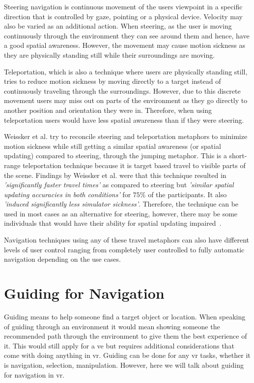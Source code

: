 Steering navigation is continuous movement of the users viewpoint in a specific direction that is controlled by gaze, pointing or a physical device. Velocity may also be varied as an additional action. When steering, as the user is moving continuously through the environment they can see around them and hence, have a good spatial awareness. However, the movement may cause motion sickness as they are physically standing still while their surroundings are moving.

Teleportation, which is also a technique where users are physically standing still, tries to reduce motion sickness by moving directly to a target instead of continuously traveling through the surroundings. However, due to this discrete movement users may miss out on parts of the environment as they go directly to another position and orientation they were in. Therefore, when using teleportation users would have less spatial awareness than if they were steering.

Weissker et al. try to reconcile steering and teleportation metaphors to minimize motion sickness while still getting a similar spatial awareness (or spatial updating) compared to steering, through the jumping metaphor. This is a short-range teleportation technique because it is target based travel to visible parts of the scene. Findings by Weissker et al. were that this technique resulted in \textit{'significantly faster travel times'} as compared to steering but \textit{'similar spatial updating accuracies in both conditions'} for $75\%$ of the participants. It also \textit{'induced significantly less	simulator sickness'}. Therefore, the technique can be used in most cases as an alternative for steering, however, there may be some individuals that would have their ability for spatial updating impaired~\cite{Weissker2018}.

Navigation techniques using any of these travel metaphors can also have different levels of user control ranging from completely user controlled to fully automatic navigation depending on the use cases.

\section{Guiding for Navigation}
\label{section:RW Guiding for Navigation}
Guiding means to help someone find a target object or location. When speaking of guiding through an environment it would mean showing someone the recommended path through the environment to give them the best experience of it. This would still apply for a \acrshort{ve} but requires additional considerations that come with doing anything in \acrfull{vr}. Guiding can be done for any \acrshort{vr} tasks, whether it is navigation, selection, manipulation. However, here we will talk about guiding for navigation in \acrshort{vr}.

